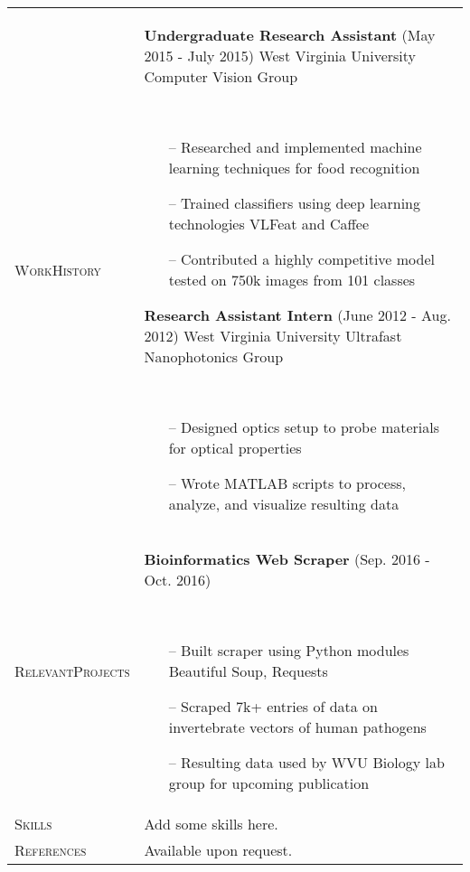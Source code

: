 \documentclass{article}
\begin{document}
\begin{tabular}{@{}p{2.5cm}@{\hspace{0.2cm}}p{13cm}@{}}
    \enspace\textsc{Work}\newline\textsc{History} &
    \enspace\textbf{Undergraduate Research Assistant}
    \hfill\small(May 2015 - July 2015)\normalsize
    \newline West Virginia University Computer Vision Group
    \par\,\small
        \begin{itemize}[leftmargin=*,nolistsep,noitemsep]
        \item[--]Researched and implemented machine learning techniques for food recognition
        \item[--]Trained classifiers using deep learning technologies VLFeat and Caffee
        \item[--]Contributed a highly competitive model tested on 750k images from 101 classes
        \newline
        \end{itemize}
    \normalsize
    \textbf{Research Assistant Intern}
    \hfill\small(June 2012 - Aug. 2012)\normalsize
    \newline West Virginia University Ultrafast Nanophotonics Group
    \par\,\small
      \begin{itemize}[leftmargin=*,nolistsep,noitemsep]
      \item[--]Designed optics setup to probe materials for optical properties
      \item[--]Wrote MATLAB scripts to process, analyze, and visualize resulting data
      \end{itemize}\\
    \normalsize

    \textsc{Relevant}\newline\textsc{Projects} &
    \textbf{Bioinformatics Web Scraper}
    \hfill\small(Sep. 2016 - Oct. 2016)\normalsize
    \par\,\small
        \begin{itemize}[leftmargin=*,nolistsep,noitemsep]
        \item[--]Built scraper using Python modules Beautiful Soup, Requests
        \item[--]Scraped 7k+ entries of data on invertebrate vectors of human pathogens
        \item[--]Resulting data used by WVU Biology lab group for upcoming publication
        \end{itemize}\\
    \normalsize

    \textsc{Skills} &
    Add some skills here. \\

    \enspace\textsc{References} &
    \enspace Available upon request. \\

  \end{tabular}
\end{document}
